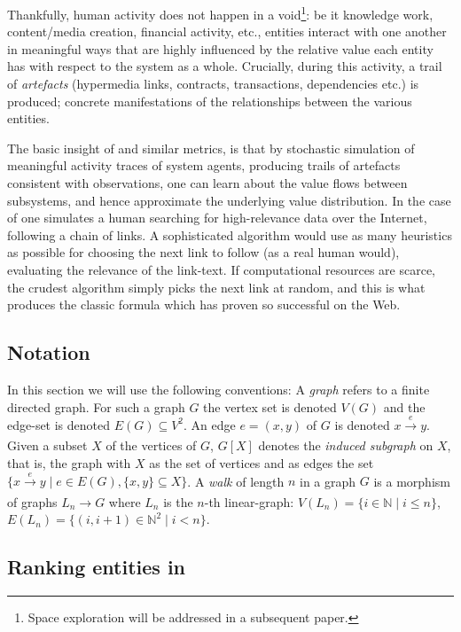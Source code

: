 Thankfully, human activity does not happen in a void\footnote{Space
  exploration will be addressed in a subsequent paper.}: be it
knowledge work, content/media creation, financial activity, etc.,
entities interact with one another in meaningful ways that are highly
influenced by the relative value each entity has with respect to the
system as a whole. Crucially, during this activity, a trail of
\emph{artefacts} (hypermedia links, contracts, transactions,
dependencies etc.) is produced; concrete manifestations
of the relationships between the various entities.

The basic insight of \pagerank{} and similar metrics, is that by
stochastic simulation of meaningful activity traces of system agents,
producing trails of artefacts consistent with observations, one can
learn about the value flows between subsystems, and hence approximate
the underlying value distribution. In the case of \pagerank{} one
simulates a human searching for high-relevance data over the Internet,
following a chain of links. A sophisticated algorithm would use as
many heuristics as possible for choosing the next link to follow (as a
real human would), \eg{} evaluating the relevance of the link-text. If
computational resources are scarce, the crudest algorithm simply picks
the next link at random, and this is what produces the classic
\pagerank{} formula which has proven so successful on the Web.

\subsection{Notation}

In this section we will use the following conventions: A \emph{graph} refers to
a finite directed graph. For such a graph $G$ the vertex set is denoted $V(G)$
and the edge-set is denoted $E(G) \subseteq V^2$. An edge $e = (x,y)$ of $G$ is
denoted $x \xrightarrow[]{e} y$. Given a subset $X$ of the vertices of $G$,
$G[X]$ denotes the \emph{induced subgraph} on $X$, that is, the graph with $X$
as the set of vertices and as edges the set
$\{ x \xrightarrow[]{e} y \mid e \in E(G), \{x,y\} \subseteq X\}$. A \emph{walk}
of length $n$ in a graph $G$ is a morphism of graphs $L_n \to G$ where $L_n$ is
the $n$-th linear-graph: $V(L_n) = \{i \in \mathbb{N} \mid i \leq n \}$,
$E(L_n) = \{ (i,i+1) \in \mathbb{N}^2 \mid i < n \}$.

\subsection{Ranking entities in \oscoin{}}
\label{s:netgraph}

